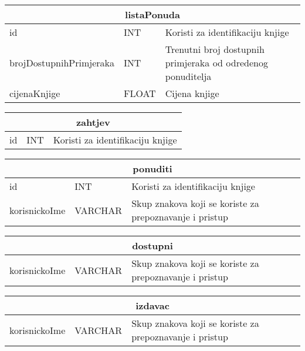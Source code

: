 \documentclass{article}
\begin{document}
	\vspace{1cm}
	\begin{tabular}{ |p{4cm}|p{3cm}|p{5cm}|  }
		\hline
		\multicolumn{3}{|c|}{\textbf{listaPonuda}} \\
		\bottomrule[2pt]
		\cellcolor{blue!10}id & INT & Koristi za identifikaciju knjige\\
		\hline
		brojDostupnihPrimjeraka & INT & Trenutni broj dostupnih primjeraka od odredenog ponuditelja\\
		\hline
		cijenaKnjige & FLOAT & Cijena knjige\\
		\hline
	\end{tabular}
	\vspace{1cm}
	\begin{tabular}{ |p{4cm}|p{3cm}|p{5cm}|  }
		\hline
		\multicolumn{3}{|c|}{\textbf{zahtjev}} \\
		\bottomrule[2pt]
		\cellcolor{blue!10}id & INT &Koristi za identifikaciju knjige\\
		\hline
	\end{tabular}
	\vspace{1cm}
	\begin{tabular}{ |p{4cm}|p{3cm}|p{5cm}|  }
		\hline
		\multicolumn{3}{|c|}{\textbf{ponuditi}} \\
		\bottomrule[2pt]
		\cellcolor{blue!10}id & INT & Koristi za identifikaciju knjige\\
		\hline
		\cellcolor{blue!10}korisnickoIme & VARCHAR & Skup znakova koji se koriste za prepoznavanje i pristup\\
		\hline
	\end{tabular}
	\vspace{1cm}
	\begin{tabular}{ |p{4cm}|p{3cm}|p{5cm}|  }
		\hline
		\multicolumn{3}{|c|}{\textbf{dostupni}} \\
		\bottomrule[2pt]
		\cellcolor{blue!10}korisnickoIme & VARCHAR & Skup znakova koji se koriste za prepoznavanje i pristup\\
		\hline
	\end{tabular}
	\vspace{1cm}
	\begin{tabular}{ |p{4cm}|p{3cm}|p{5cm}|  }
		\hline
		\multicolumn{3}{|c|}{\textbf{izdavac}} \\
		\bottomrule[2pt]
		\cellcolor{blue!10}korisnickoIme & VARCHAR & Skup znakova koji se koriste za prepoznavanje i pristup\\
		\hline
	\end{tabular}
	\vspace{1cm}
\end{document}
